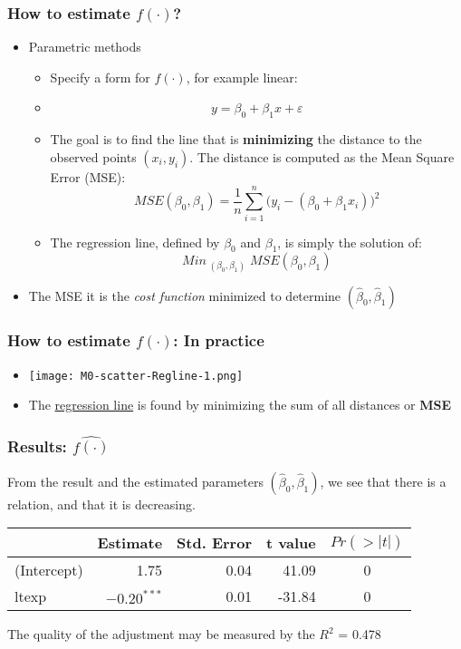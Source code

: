 \documentclass[xcolor=x11names,compress, aspectratio=169]{beamer}
\renewcommand{\(}{\begin{columns}}
\renewcommand{\)}{\end{columns}}
\newcommand{\<}[1]{\begin{column}{#1}}
\renewcommand{\>}{\end{column}}
\begin{document}
\begin{frame} %
\frametitle{How to estimate $f(\cdot)$?}
 \begin{itemize}
  \item<+-> Parametric methods
   \begin{itemize}
      \item<+->[] Specify a form for $f(\cdot)$, for example linear:
      \item<+->[] $$y = \beta_0 + \beta_1 x + \varepsilon$$
      \item<+-> The goal is to find the line that is  \textbf{minimizing} the distance to the observed points $(x_i, y_i)$.
                The distance is computed as the Mean Square Error (MSE): $$ MSE(\beta_0, \beta_1) = \frac{1}{n} \sum_{i=1}^{n} \bigl(y_i - (\beta_0 + \beta_1 x_i)\bigr)^2 $$
      \item<+-> The regression line, defined by $\beta_0$ and $\beta_1$,  is simply the solution of:
       $$Min_{\; (\beta_0 , \beta_1)} \; MSE(\beta_0, \beta_1) $$
   \end{itemize}
 \item<+->[]  The MSE it is the \textit{cost function} minimized to determine $ (\widehat \beta_0, \widehat \beta_1)$
 \end{itemize}

\end{frame}


\begin{frame} %
\frametitle{How to estimate $f(\cdot)$: In practice}
 \begin{itemize}
  \item<+->[] \texttt{[image: M0-scatter-Regline-1.png]}
  \item<+->[] The \href{https://mlu-explain.github.io/linear-regression/}{\textcolor[rgb]{0.00,0.50,0.75}{regression line}} is found by minimizing the sum of all distances or \textbf{MSE}
 \end{itemize}
\end{frame}


\begin{frame} %
\frametitle{Results: $ \widehat{f(\cdot)}$}
From the result and the estimated  parameters $ (\widehat \beta_0, \widehat \beta_1)$, we see that there is a relation, and that it is decreasing.
\begin{table}
\centering
\begin{tabular}{l|rrrc}
\hline
  & Estimate & Std. Error & t value & $Pr(>|t|)$\\
\hline
(Intercept) & 1.75 & 0.04 & 41.09 & 0\\
\hline
ltexp &\textbf{ $-0.20^{***}$ }& 0.01 & -31.84 & 0\\
\hline
\end{tabular}
\end{table}
\vspace{0.5cm}
 The quality of the adjustment may be measured by the $R^2$ = 0.478

\end{frame}
\end{document}

